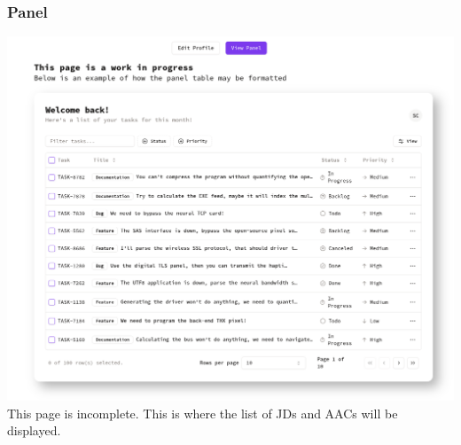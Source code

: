 \subsubsection{Panel}
\includegraphics[width=\linewidth]{images/panel.png}
This page is incomplete. This is where the list of JDs and AACs will be displayed.